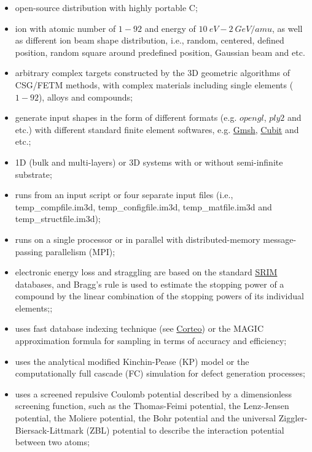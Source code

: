 \begin{itemize}

\item open-source distribution with highly portable C;
\item ion with atomic number of $1-92$ and energy of $10~eV-2~GeV/amu$, as well as different ion beam shape distribution, i.e., random, centered, defined position, random square around predefined position, Gaussian beam and etc.
\item arbitrary complex targets constructed by the 3D geometric algorithms of CSG/FETM methods\cite{Li:2005,Li:2008,Li:2009,Li2:2011,Zhang:2011,Li:2013}, with complex materials including single elements ($1-92$), alloys and compounds;
\item generate input shapes in the form of different formats (e.g. $opengl$, $ply2$ and etc.) with different standard finite element softwares, e.g. \href{http://geuz.org/gmsh/}{Gmsh}\cite{Geuzaine:2009}, \href{https://cubit.sandia.gov}{Cubit} and etc.;
\item 1D (bulk and multi-layers) or 3D systems with or without semi-infinite substrate;
\item runs from an input script or four separate input files (i.e., temp\_compfile.im3d, temp\_configfile.im3d, temp\_matfile.im3d and temp\_structfile.im3d);
\item runs on a single processor or in parallel with distributed-memory message-passing parallelism (MPI);
\item electronic energy loss and straggling are based on the standard \href{http://www.srim.org}{SRIM} databases\cite{Ziegler:2010}, and Bragg's rule\cite{Bragg:1905} is used to estimate the stopping power of a compound by the linear combination of the stopping powers of its individual elements;;
\item uses fast database indexing technique (see \href{http://www.lps.umontreal.ca/~schiette/index.php?n=Recherche.Corteo}{Corteo}\cite{Schiettekatte:2008}) or the MAGIC approximation formula \cite{Ziegler:2010} for sampling in terms of accuracy and efficiency;
\item uses the analytical modified Kinchin-Pease (KP) model\cite{Kinchin:1955,Norgett:1975} or the computationally full cascade (FC) simulation for defect generation processes;
\item uses a screened repulsive Coulomb potential described by a dimensionless screening function, such as the Thomas-Feimi potential\cite{Sommerfeld:1932}, the Lenz-Jensen potential\cite{Lenz:1932}, the Moliere potential\cite{Moliere:1947}, the Bohr potential\cite{Bohr:1948} and the universal Ziggler-Biersack-Littmark (ZBL) potential\cite{Ziegler:2010} to describe the interaction potential between two atoms;

\end{itemize}
